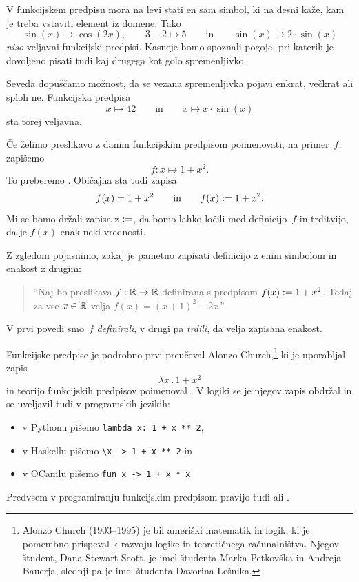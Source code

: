 V funkcijskem predpisu mora na levi stati en sam simbol, ki na desni kaže, kam je treba
vstaviti element iz domene. Tako
%
\begin{equation*}
  \sin(x) \mapsto \cos(2 x),
  \qquad
  3 + 2 \mapsto 5
  \qquad\text{in}\qquad
  \sin(x) \mapsto 2 \cdot \sin(x)
\end{equation*}
%
\emph{niso} veljavni funkcijski predpisi. Kasneje bomo spoznali pogoje, pri katerih je dovoljeno pisati tudi kaj drugega kot golo spremenljivko.

Seveda dopuščamo možnost, da se vezana spremenljivka pojavi enkrat, večkrat ali sploh ne.
Funkcijska predpisa
%
%
\begin{equation*}
  x \mapsto 42
  \qquad\text{in}\qquad
  x \mapsto x \cdot \sin(x)
\end{equation*}
%
sta torej veljavna.

Če želimo preslikavo z danim funkcijskim predpisom poimenovati, na primer~$f$, zapišemo
%
\begin{equation*}
  f : x \mapsto 1 + x^2.
\end{equation*}
%
To preberemo . Običajna sta tudi zapisa
%
\begin{equation*}
  f(x) = 1 + x^2
  \qquad\text{in}\qquad
  f(x) \mathrel{{:}{=}} 1 + x^2.
\end{equation*}
%
Mi se bomo držali zapisa z $\mathrel{{:}{=}}$, da bomo lahko ločili med definicijo~$f$ in trditvijo, da je $f(x)$ enak neki vrednosti.

\begin{zgled}
  Z zgledom pojasnimo, zakaj je pametno zapisati definicijo z enim simbolom in enakost z drugim:
  \begin{quote}
    ``Naj bo preslikava $f : \mathbb{R} \to \mathbb{R}$ definirana s predpisom $f(x) \mathrel{{:}{=}} 1 + x^2$. Tedaj za vse $x \in \mathbb{R}$ velja $f(x) = (x + 1)^2 - 2 x$.'' 
  \end{quote}
  V prvi povedi smo~$f$ \emph{definirali}, v drugi pa \emph{trdili}, da velja zapisana enakost.
\end{zgled}

Funkcijske predpise je podrobno prvi preučeval Alonzo Church,\footnote{Alonzo Church
  (1903--1995) je bil ameriški matematik in logik, ki je pomembno prispeval k razvoju
  logike in teoretičnega računalništva. Njegov študent, Dana Stewart Scott, je imel
  študenta Marka Petkovška in Andreja Bauerja, slednji pa je imel študenta Davorina
  Lešnika.} ki je uporabljal zapis
%
\begin{equation*}
  \lambda x \,.\, 1 + x^2
\end{equation*}
%
in teorijo funkcijskih predpisov poimenoval . V logiki se je njegov
zapis obdržal in se uveljavil tudi v programskih jezikih:
%
\begin{itemize}
\item v Pythonu pišemo \verb|lambda x: 1 + x ** 2|,
\item v Haskellu pišemo \verb|\x -> 1 + x ** 2| in
\item v OCamlu pišemo \verb|fun x -> 1 + x * x|.
\end{itemize}
%
Predvsem v programiranju funkcijskim predpisom pravijo tudi  ali .

